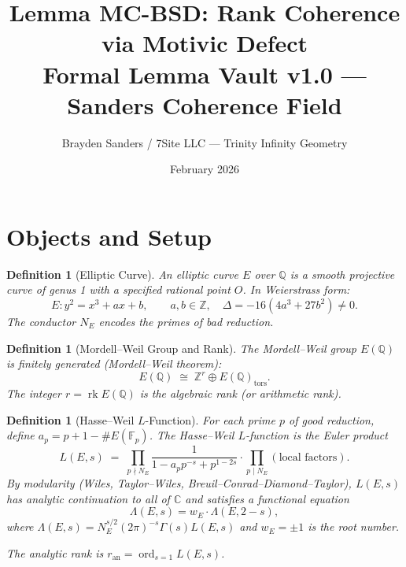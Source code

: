 \documentclass[11pt]{article}
\title{%
  Lemma MC-BSD: Rank Coherence via Motivic Defect\\[4pt]
  \large Formal Lemma Vault v1.0 --- Sanders Coherence Field}
\author{Brayden Sanders / 7Site LLC --- Trinity Infinity Geometry}
\date{February 2026}
\newtheorem{definition}[lemma]{Definition}
\theoremstyle{definition}
\DeclareMathOperator{\rk}{rk}
\DeclareMathOperator{\ord}{ord}
\begin{document}
\maketitle

\section{Objects and Setup}

\begin{definition}[Elliptic Curve]
\label{def:ec}
An \emph{elliptic curve} $E$ over $\mathbb{Q}$ is a smooth projective curve of genus 1
with a specified rational point $O$.  In Weierstrass form:
\[
  E : y^2 = x^3 + ax + b, \qquad a, b \in \mathbb{Z}, \quad \Delta = -16(4a^3 + 27b^2) \neq 0.
\]
The \emph{conductor} $N_E$ encodes the primes of bad reduction.
\end{definition}

\begin{definition}[Mordell--Weil Group and Rank]
\label{def:MW}
The \emph{Mordell--Weil group} $E(\mathbb{Q})$ is finitely generated (Mordell--Weil theorem):
\[
  E(\mathbb{Q}) \;\cong\; \mathbb{Z}^r \oplus E(\mathbb{Q})_{\mathrm{tors}}.
\]
The integer $r = \rk E(\mathbb{Q})$ is the \emph{algebraic rank} (or arithmetic rank).
\end{definition}

\begin{definition}[Hasse--Weil $L$-Function]
\label{def:L-function}
For each prime $p$ of good reduction, define $a_p = p + 1 - \#E(\mathbb{F}_p)$.
The Hasse--Weil $L$-function is the Euler product
\[
  L(E, s) \;=\; \prod_{p \nmid N_E} \frac{1}{1 - a_p p^{-s} + p^{1-2s}}
  \cdot \prod_{p \mid N_E} (\text{local factors}).
\]
By modularity (Wiles, Taylor--Wiles, Breuil--Conrad--Diamond--Taylor),
$L(E,s)$ has analytic continuation to all of $\mathbb{C}$ and satisfies a functional equation
\[
  \Lambda(E, s) = w_E \cdot \Lambda(E, 2 - s),
\]
where $\Lambda(E, s) = N_E^{s/2} (2\pi)^{-s} \Gamma(s) L(E, s)$ and $w_E = \pm 1$ is the root number.

The \emph{analytic rank} is $r_{\mathrm{an}} = \ord_{s=1} L(E, s)$.
\end{definition}
\end{document}
